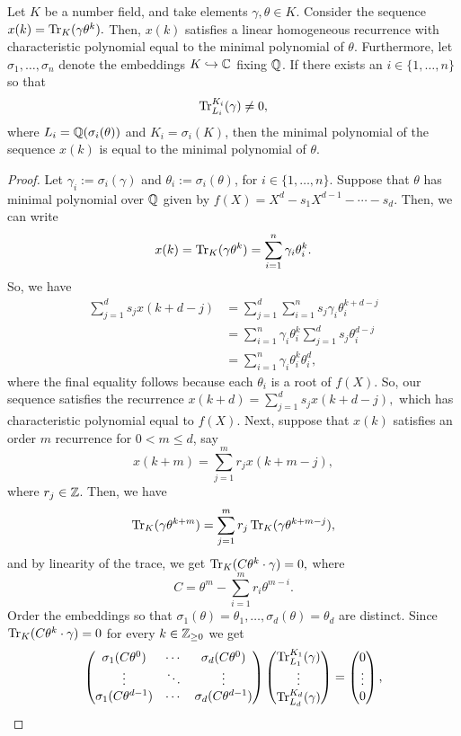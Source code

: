 \documentclass[11pt]{amsart}
\begin{document}
\begin{prop} \label{prop1} Let $K$ be a number field, and take elements $\gamma, \theta \in K$. Consider the sequence
$x(k)=\operatorname{Tr}_K(\gamma \theta^k).$ Then, $x(k)$ satisfies a linear homogeneous recurrence with characteristic polynomial equal to the minimal polynomial of $\theta$. Furthermore, let $\sigma_1, \dots, \sigma_n$ denote the embeddings $K \hookrightarrow \mathbb{C}$ fixing $\mathbb{Q}$. If there exists an $i \in \{1, \dots, n\}$ so that
\[\operatorname{Tr}_{L_i}^{K_i}(\gamma) \not=0,\]
where $L_i=\mathbb{Q}(\sigma_i(\theta))$ and $K_i=\sigma_i(K)$, then the minimal polynomial of the sequence $x(k)$ is equal to the minimal polynomial of $\theta$.
\begin{proof}
Let $\gamma_i:=\sigma_i(\gamma)$ and $\theta_i:=\sigma_i(\theta)$, for $i \in \{1, \dots, n\}$. Suppose that $\theta$ has minimal polynomial over $\mathbb{Q}$ given by $f(X)=X^d-s_1X^{d-1}-\cdots-s_d.$
Then, we can write
\[x(k)=\operatorname{Tr}_K(\gamma \theta^k)=\sum_{i=1}^n \gamma_i \theta_i^k.\]
So, we have 
\begin{align*}
\sum_{j=1}^d s_j x(k+d-j)	&= \sum_{j=1}^d \sum_{i=1}^n s_j \gamma_i \theta_i^{k+d-j} \\
					&=\sum_{i=1}^n \gamma_i \theta_i^k \sum_{j=1}^d s_j \theta_i^{d-j} \\
					&=\sum_{i=1}^n \gamma_i \theta_i^k \theta_i^d,
\end{align*}
where the final equality follows because each $\theta_i$ is a root of $f(X)$. So, our sequence satisfies the recurrence $x(k+d)=\sum_{j=1}^d s_jx(k+d-j),$ which has characteristic polynomial equal to $f(X)$. Next, suppose that $x(k)$ satisfies an order $m$ recurrence for $0 < m \leq d$, say
\[x(k+m)= \sum_{j=1}^{m} r_j x(k+m-j),\]
where $r_j \in \mathbb{Z}$. Then, we have
\[\operatorname{Tr}_K(\gamma \theta^{k+m})=\sum_{j=1}^m r_j \operatorname{Tr}_K(\gamma \theta^{k+m-j}),\]
and by linearity of the trace, we get $\operatorname{Tr}_K(C \theta^k \cdot \gamma)=0,$
where \[C=\theta^m-\sum_{i=1}^m r_i \theta^{m-i}.\] 
Order the embeddings so that $\sigma_1(\theta)=\theta_1, \dots, \sigma_d(\theta)=\theta_d$ are distinct. Since $\operatorname{Tr}_K(C \theta^k \cdot \gamma)=0$ for every $k \in \mathbb{Z}_{\geq 0}$ we get
\begin{equation}
\label{matrices}
\begin{pmatrix} \sigma_1(C \theta^0) & \cdots & \sigma_d(C \theta^0) \\ \vdots & \ddots & \vdots \\ \sigma_1(C \theta^{d-1}) & \cdots & \sigma_d(C \theta^{d-1}) \end{pmatrix} 
\begin{pmatrix} \operatorname{Tr}_{L_1}^{K_1}(\gamma) \\ \vdots \\ \operatorname{Tr}_{L_d}^{K_d}(\gamma)\end{pmatrix}= \begin{pmatrix} 0 \\ \vdots \\ 0 \end{pmatrix},\end{equation}

\end{proof}
\end{prop}
\end{document}
